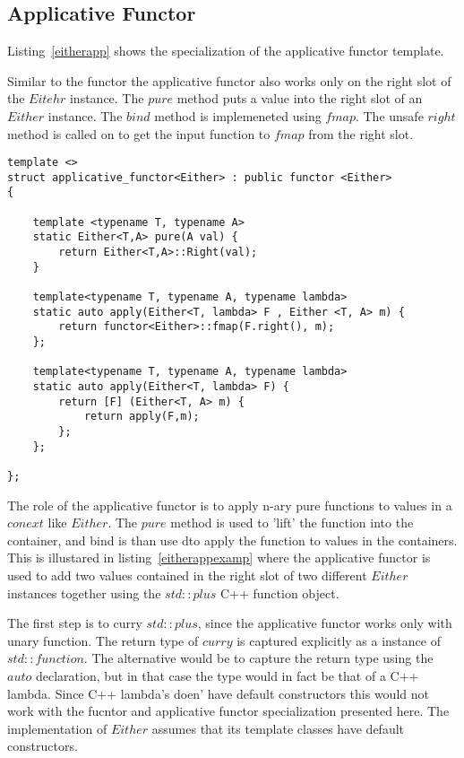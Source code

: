 \documentclass[12pt,fleqn]{article}
\begin{document}
\subsection{Applicative Functor}
%

Listing~\ref{eitherapp} shows the specialization of the applicative functor template.

Similar to the functor the applicative functor also works only on the right slot of the $Eitehr$ instance.
The $pure$ method puts a value into the right slot of an $Either$ instance.
The $bind$ method is implemeneted using $fmap$. 
The unsafe $right$ method is called on to get the input function to $fmap$ from the right slot.

%
%
\begin{minipage}{\linewidth}
\begin{lstlisting}[caption=Either applicative functor,label=eitherapp]
template <> 
struct applicative_functor<Either> : public functor <Either>
{

	template <typename T, typename A> 
	static Either<T,A> pure(A val) {
		return Either<T,A>::Right(val);
	}

	template<typename T, typename A, typename lambda>
	static auto apply(Either<T, lambda> F , Either <T, A> m) {
		return functor<Either>::fmap(F.right(), m);
	};

	template<typename T, typename A, typename lambda>
	static auto apply(Either<T, lambda> F) {
		return [F] (Either<T, A> m) {
			return apply(F,m);
		};
	};

};
\end{lstlisting}
\end{minipage}
%
%
%

The role of the applicative functor is to apply n-ary pure functions to values in a $conext$ like $Either$.
The $pure$ method is used to 'lift' the function into the container, and bind is than use dto apply the function to values in the containers.
This is illustared in listing~\ref{eitherappexamp} where the applicative functor is used to add two values contained in the right slot of two 
different $Either$ instances together using the $std::plus$ C++ function object.

The first step is to curry $std::plus$, since the applicative functor works only with unary function.
The return type of $curry$ is captured explicitly as a instance of $std::function$. 
The alternative would be to capture the return type using the $auto$ declaration, but in that case the type would in fact be that of a C++ lambda.
Since C++ lambda's doen' have default constructors this would not work with the fucntor and applicative functor specialization presented here.
The implementation of $Either$ assumes that its template classes have default constructors. 
\end{document}
